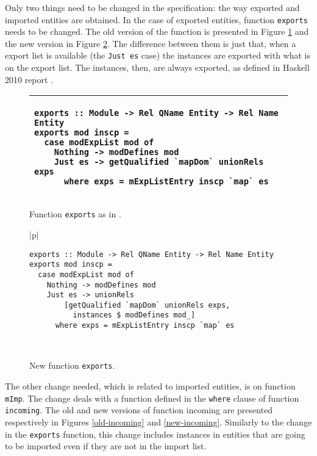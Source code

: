 \documentclass[msc]{ppgccufmg}
\begin{document}
{Only two things need to be changed in the specification: the way
exported and imported entities are obtained.  In the case of exported
entities, function \texttt{exports} \citep[section~5.2]{formal} needs
to be changed. The old version of the function is presented in Figure
\ref{old-exports} and the new version in Figure \ref{new-exports}.
The difference between them is just that, when a export list is
available (the \texttt{Just es} case) the instances are exported with
what is on the export list.  The instances, then, are always exported,
as defined in Haskell 2010 report \citep[section 5.4]{report}.

\begin{figure}
\caption{Function \texttt{exports} as in \citep[section 5.2]{formal}.\label{old-exports}}
\begin{tabular}{|p{\textwidth}|}
\hline
\begin{verbatim}
exports :: Module -> Rel QName Entity -> Rel Name Entity
exports mod inscp =
  case modExpList mod of
    Nothing -> modDefines mod
    Just es -> getQualified `mapDom` unionRels exps
      where exps = mExpListEntry inscp `map` es
\end{verbatim}
\\
\hline
\end{tabular}
\end{figure}

\begin{figure}
\caption{New function \texttt{exports}.\label{new-exports}}
\begin{tabular}{|p{\textwidth}|}
\hline
\begin{verbatim}
exports :: Module -> Rel QName Entity -> Rel Name Entity
exports mod inscp =
  case modExpList mod of
    Nothing -> modDefines mod
    Just es -> unionRels
        [getQualified `mapDom` unionRels exps,
          instances $ modDefines mod_]
      where exps = mExpListEntry inscp `map` es
\end{verbatim}
\\
\hline
\end{tabular}
\end{figure}

The other change needed, which is related to imported entities, is on
function \texttt{mImp}.  The change deals with a function defined in
the \texttt{where} clause of function \texttt{incoming}.  The old and
new versions of function incoming are presented respectively in
Figures \ref{old-incoming} and \ref{new-incoming}.  Similarly to the
change in the \texttt{exports} function, this change includes
instances in entities that are going to be imported even if they are
not in the import list.

}
\end{document}
